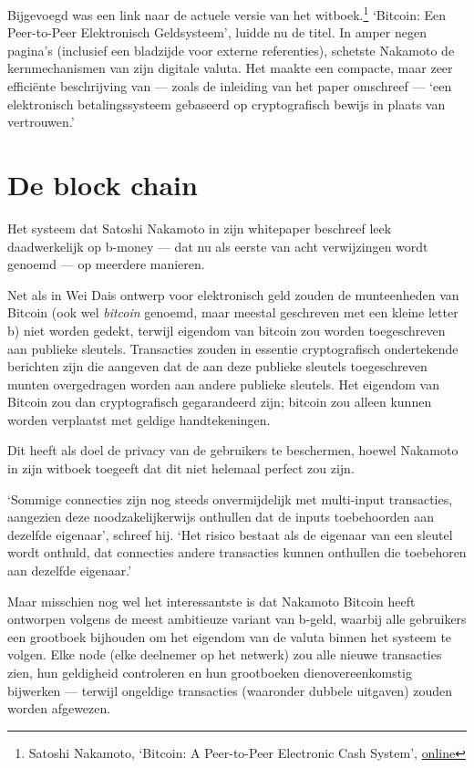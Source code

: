 \documentclass[
  a5paper,
  smalldemyvopaper,11pt,twoside,onecolumn,openright,extrafontsizes]{memoir}
\begin{document}
Bijgevoegd was een link naar de actuele versie van het
witboek.\footnote{Satoshi Nakamoto, `Bitcoin: A Peer-to-Peer Electronic
  Cash System', \href{https://bitcoin.org/bitcoin.pdf}{online}}
`Bitcoin: Een Peer-to-Peer Elektronisch Geldsysteem', luidde nu de
titel. In amper negen pagina's (inclusief een bladzijde voor externe
referenties), schetste Nakamoto de kernmechanismen van zijn digitale
valuta. Het maakte een compacte, maar zeer efficiënte beschrijving van
--- zoals de inleiding van het paper omschreef --- `een elektronisch
betalingssysteem gebaseerd op cryptografisch bewijs in plaats van
vertrouwen.'

\section{De block chain}\label{de-block-chain}

Het systeem dat Satoshi Nakamoto in zijn whitepaper beschreef leek
daadwerkelijk op b-money --- dat nu als eerste van acht verwijzingen
wordt genoemd --- op meerdere manieren.

Net als in Wei Dais ontwerp voor elektronisch geld zouden de
munteenheden van Bitcoin (ook wel \emph{bitcoin} genoemd, maar meestal
geschreven met een kleine letter b) niet worden gedekt, terwijl eigendom
van bitcoin zou worden toegeschreven aan publieke sleutels. Transacties
zouden in essentie cryptografisch ondertekende berichten zijn die
aangeven dat de aan deze publieke sleutels toegeschreven munten
overgedragen worden aan andere publieke sleutels. Het eigendom van
Bitcoin zou dan cryptografisch gegarandeerd zijn; bitcoin zou alleen
kunnen worden verplaatst met geldige handtekeningen.

Dit heeft als doel de privacy van de gebruikers te beschermen, hoewel
Nakamoto in zijn witboek toegeeft dat dit niet helemaal perfect zou
zijn.

`Sommige connecties zijn nog steeds onvermijdelijk met multi-input
transacties, aangezien deze noodzakelijkerwijs onthullen dat de inputs
toebehoorden aan dezelfde eigenaar', schreef hij. `Het risico bestaat
als de eigenaar van een sleutel wordt onthuld, dat connecties andere
transacties kunnen onthullen die toebehoren aan dezelfde eigenaar.'

Maar misschien nog wel het interessantste is dat Nakamoto Bitcoin heeft
ontworpen volgens de meest ambitieuze variant van b-geld, waarbij alle
gebruikers een grootboek bijhouden om het eigendom van de valuta binnen
het systeem te volgen. Elke node (elke deelnemer op het netwerk) zou
alle nieuwe transacties zien, hun geldigheid controleren en hun
grootboeken dienovereenkomstig bijwerken --- terwijl ongeldige
transacties (waaronder dubbele uitgaven) zouden worden afgewezen.
\end{document}
